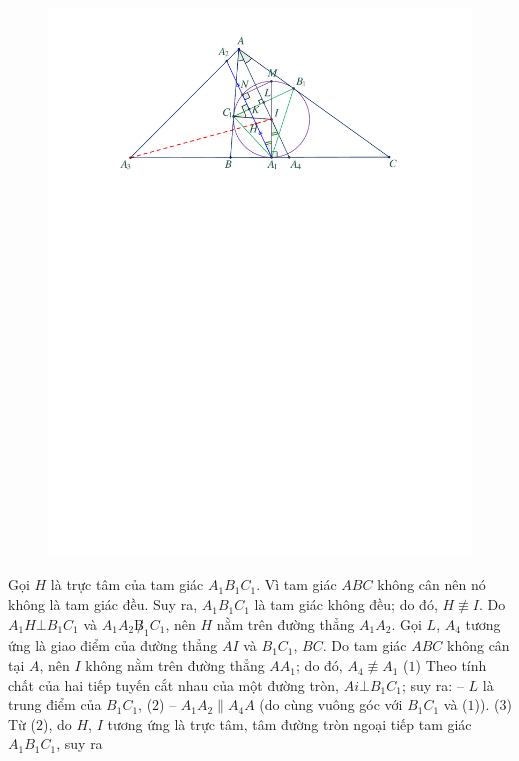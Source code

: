 \begin{multicols}{2}
\begin{figure}[H]
		\includegraphics[width=1\linewidth]{P628}
		\vspace*{-15pt}
	\end{figure}
	Gọi $H$ là trực tâm của tam giác $A_1B_1C_1$.
	\vskip 0.05cm 
	Vì tam giác $ABC$ không cân nên nó không là tam giác đều. Suy ra, $A_1B_1C_1$  là tam giác không đều; do đó,  $H \not\equiv I$.
	\vskip 0.05cm
	Do $A_1H \bot B_1C_1$  và  $A_1A_2 \not B_1C_1$, nên $H$ nằm trên đường thẳng  $A_1A_2$.
	\vskip 0.05cm
	Gọi $L$, $A_4$  tương ứng là giao điểm của đường thẳng $AI$ và  $B_1C_1$, $BC$.
	\vskip 0.05cm
	Do tam giác $ABC$ không cân tại $A$, nên $I$ không nằm trên đường thẳng $AA_1$; do đó, $A_4 \not\equiv A_1$    \hfill ($1$)
	\vskip 0.05cm 
	Theo tính chất của hai tiếp tuyến cắt nhau của một đường tròn,  $Ai \bot B_1C_1$; suy ra:
	\vskip 0.05cm
	-- $L$ là trung điểm của $B_1C_1$, \hfill ($2$)
	\vskip 0.05cm
	-- $A_1A_2 \parallel A_4A$  (do cùng vuông góc với  $B_1C_1$ và ($1$)). \hfill($3$)
	\vskip 0.05cm
	Từ ($2$), do $H$, $I$ tương ứng là trực tâm, tâm đường tròn ngoại tiếp tam giác  $A_1B_1C_1$, suy ra

\end{multicols}
